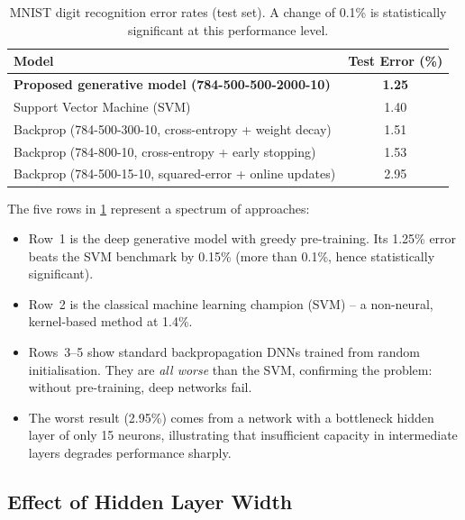 \documentclass[12pt,a4paper]{article}
\begin{document}
\begin{table}[ht]
\centering
\caption{MNIST digit recognition error rates (test set).
         A change of 0.1\% is statistically significant at this performance level.}
\label{tab:mnist-results}
\begin{tabular}{lc}
\toprule
\textbf{Model} & \textbf{Test Error (\%)} \\
\midrule
\textbf{Proposed generative model (784-500-500-2000-10)} & \textbf{1.25} \\
Support Vector Machine (SVM) & 1.40 \\
Backprop (784-500-300-10, cross-entropy + weight decay) & 1.51 \\
Backprop (784-800-10, cross-entropy + early stopping) & 1.53 \\
Backprop (784-500-15-10, squared-error + online updates) & 2.95 \\
\bottomrule
\end{tabular}
\end{table}

\begin{example}
  The five rows in \cref{tab:mnist-results} represent a spectrum of
  approaches:
  \begin{itemize}
    \item Row~1 is the deep generative model with greedy pre-training.
          Its 1.25\% error beats the SVM benchmark by 0.15\%
          (more than 0.1\%, hence statistically significant).
    \item Row~2 is the classical machine learning champion (SVM) -- a
          non-neural, kernel-based method at 1.4\%.
    \item Rows~3--5 show standard backpropagation DNNs trained from
          random initialisation.  They are \emph{all worse} than the SVM,
          confirming the problem: without pre-training, deep networks fail.
    \item The worst result (2.95\%) comes from a network with a bottleneck
          hidden layer of only 15 neurons, illustrating that insufficient
          capacity in intermediate layers degrades performance sharply.
  \end{itemize}
\end{example}

\subsection{Effect of Hidden Layer Width}
\end{document}

